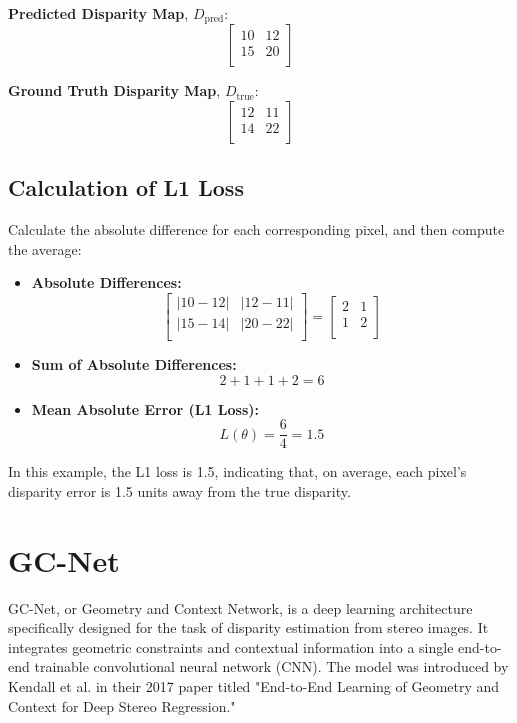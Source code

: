 \documentclass[22pt]{report}
\begin{document}
    \textbf{Predicted Disparity Map}, \( D_{\text{pred}} \):
\[
        \begin{bmatrix}
        10 & 12 \\
        15 & 20 \\
        \end{bmatrix}
        \]
        
        \textbf{Ground Truth Disparity Map}, \( D_{\text{true}} \):
        \[
        \begin{bmatrix}
        12 & 11 \\
        14 & 22 \\
        \end{bmatrix}
        \]
\subsection*{Calculation of L1 Loss}
Calculate the absolute difference for each corresponding pixel, and then compute the average:
\begin{itemize}
    \item \textbf{Absolute Differences:}
            \[
            \begin{bmatrix}
            |10 - 12| & |12 - 11| \\
            |15 - 14| & |20 - 22| \\
            \end{bmatrix}
            =
            \begin{bmatrix}
            2 & 1 \\
            1 & 2 \\
            \end{bmatrix}
            \]
    \item \textbf{Sum of Absolute Differences:}
                \[
                2 + 1 + 1 + 2 = 6
                \]
    \item \textbf{Mean Absolute Error (L1 Loss):}
            \[
            L(\theta) = \frac{6}{4} = 1.5
            \]
\end{itemize}
\vspace{8}
In this example, the L1 loss is 1.5, indicating that, on average, each pixel's disparity error is 1.5 units away from the true disparity.

\section{GC-Net}
GC-Net, or Geometry and Context Network, is a deep learning architecture specifically designed for the task of disparity estimation from stereo images. It integrates geometric constraints and contextual information into a single end-to-end trainable convolutional neural network (CNN). The model was introduced by Kendall et al. in their 2017 paper titled "End-to-End Learning of Geometry and Context for Deep Stereo Regression."\\
\end{document}
